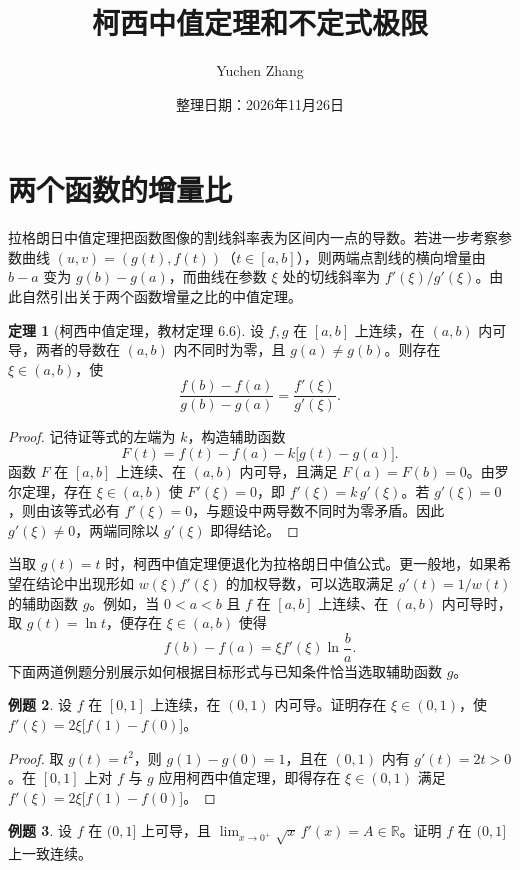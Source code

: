 \documentclass[UTF8,fontset=fandol,a4paper,12pt]{ctexart}
\title{柯西中值定理和不定式极限}
\author{Yuchen Zhang}
\date{整理日期：2026年11月26日}
\makeatletter
\theoremstyle{definition}
\newtheorem{theorem}{定理}[section]
\newtheorem{example}[theorem]{例题}
\renewcommand{\maketitle}{\begin{center}{\LARGE\bfseries\@title\par}\vspace{0.6em}\@author\par\vspace{0.2em}{\small\@date\par}\end{center}}
\makeatother
\begin{document}
\maketitle

\section{两个函数的增量比}
拉格朗日中值定理把函数图像的割线斜率表为区间内一点的导数。若进一步考察参数曲线 $(u,v)=(g(t),f(t))$（$t\in[a,b]$），则两端点割线的横向增量由 $b-a$ 变为 $g(b)-g(a)$，而曲线在参数 $\xi$ 处的切线斜率为 $f'(\xi)/g'(\xi)$。由此自然引出关于两个函数增量之比的中值定理。

\begin{theorem}[柯西中值定理，教材定理 6.6]
设 $f,g$ 在 $[a,b]$ 上连续，在 $(a,b)$ 内可导，两者的导数在 $(a,b)$ 内不同时为零，且 $g(a)\ne g(b)$。则存在 $\xi\in(a,b)$，使
\[
 \frac{f(b)-f(a)}{g(b)-g(a)}=\frac{f'(\xi)}{g'(\xi)}.
\]
\end{theorem}

\begin{proof}
记待证等式的左端为 $k$，构造辅助函数
\[
 F(t)=f(t)-f(a)-k\bigl[g(t)-g(a)\bigr].
\]
函数 $F$ 在 $[a,b]$ 上连续、在 $(a,b)$ 内可导，且满足 $F(a)=F(b)=0$。由罗尔定理，存在 $\xi\in(a,b)$ 使 $F'(\xi)=0$，即 $f'(\xi)=k\,g'(\xi)$。若 $g'(\xi)=0$，则由该等式必有 $f'(\xi)=0$，与题设中两导数不同时为零矛盾。因此 $g'(\xi)\ne0$，两端同除以 $g'(\xi)$ 即得结论。
\end{proof}

当取 $g(t)=t$ 时，柯西中值定理便退化为拉格朗日中值公式。更一般地，如果希望在结论中出现形如 $w(\xi)f'(\xi)$ 的加权导数，可以选取满足 $g'(t)=1/w(t)$ 的辅助函数 $g$。例如，当 $0<a<b$ 且 $f$ 在 $[a,b]$ 上连续、在 $(a,b)$ 内可导时，取 $g(t)=\ln t$，便存在 $\xi\in(a,b)$ 使得
\[
 f(b)-f(a)=\xi f'(\xi)\ln\frac ba.
\]
下面两道例题分别展示如何根据目标形式与已知条件恰当选取辅助函数 $g$。

\begin{example}
设 $f$ 在 $[0,1]$ 上连续，在 $(0,1)$ 内可导。证明存在 $\xi\in(0,1)$，使 $f'(\xi)=2\xi\bigl[f(1)-f(0)\bigr]$。
\end{example}

\begin{proof}
取 $g(t)=t^2$，则 $g(1)-g(0)=1$，且在 $(0,1)$ 内有 $g'(t)=2t>0$。在 $[0,1]$ 上对 $f$ 与 $g$ 应用柯西中值定理，即得存在 $\xi\in(0,1)$ 满足 $f'(\xi)=2\xi\bigl[f(1)-f(0)\bigr]$。
\end{proof}

\begin{example}
设 $f$ 在 $(0,1]$ 上可导，且 $\lim_{x\to0^+}\sqrt{x}\,f'(x)=A\in\mathbb R$。证明 $f$ 在 $(0,1]$ 上一致连续。
\end{example}
\end{document}
